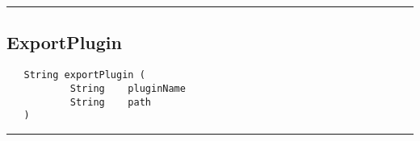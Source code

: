 \rule{15cm}{2pt}
\subsection{ExportPlugin}
\label{Api:ExportPlugin}
\begin{verbatim}
   String exportPlugin (
           String    pluginName
           String    path
   )
\end{verbatim}



\rule{15cm}{2pt}

